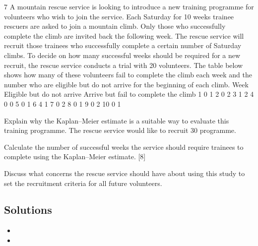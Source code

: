 \documentclass[a4paper,12pt]{article}
\begin{document}


7 A mountain rescue service is looking to introduce a new training programme for
volunteers who wish to join the service. Each Saturday for 10 weeks trainee rescuers
are asked to join a mountain climb. Only those who successfully complete the climb
are invited back the following week.
The rescue service will recruit those trainees who successfully complete a certain
number of Saturday climbs. To decide on how many successful weeks should be
required for a new recruit, the rescue service conducts a trial with 20 volunteers. The
table below shows how many of these volunteers fail to complete the climb each week
and the number who are eligible but do not arrive for the beginning of each climb.
Week Eligible but do
not arrive
Arrive but fail to
complete the climb
1 0 1
2 0 2
3 1 2
4 0 0
5 0 1
6 4 1
7 0 2
8 0 1
9 0 2
10 0 1
\item   Explain why the Kaplan–Meier estimate is a suitable way to evaluate this
training programme. 
The rescue service would like to recruit 30%
programme.
\item   Calculate the number of successful weeks the service should require trainees
to complete using the Kaplan–Meier estimate. [8]
\item  Discuss what concerns the rescue service should have about using this study to
set the recruitment criteria for all future volunteers. 

\subsection*{Solutions}

\begin{itemize}
\item
\item
\end{itemize}
\end{document}
